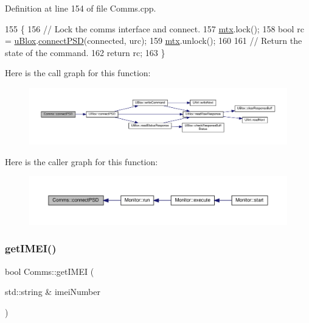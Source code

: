 Definition at line 154 of file Comms.\+cpp.


\begin{DoxyCode}
155 \{
156     \textcolor{comment}{// Lock the comms interface and connect.}
157     \hyperlink{class_comms_a21df861b1202573e4cd0cb5666d638fe}{mtx}.lock();
158     \textcolor{keywordtype}{bool} rc = \hyperlink{class_comms_ac64dea134b116147e5441172346dbd6c}{uBlox}.\hyperlink{class_u_blox_ac250bd4aea14e09b3a2595c2b8eda18a}{connectPSD}(connected, urc);
159     \hyperlink{class_comms_a21df861b1202573e4cd0cb5666d638fe}{mtx}.unlock();
160 
161     \textcolor{comment}{// Return the state of the command.}
162     \textcolor{keywordflow}{return} rc;
163 \}
\end{DoxyCode}
Here is the call graph for this function\+:\nopagebreak
\begin{figure}[H]
\begin{center}
\leavevmode
\includegraphics[width=350pt]{d8/dcc/class_comms_a6d720b51b543ec05b140efdde4cca824_cgraph}
\end{center}
\end{figure}
Here is the caller graph for this function\+:\nopagebreak
\begin{figure}[H]
\begin{center}
\leavevmode
\includegraphics[width=350pt]{d8/dcc/class_comms_a6d720b51b543ec05b140efdde4cca824_icgraph}
\end{center}
\end{figure}
\mbox{\label{class_comms_ab545396d2360e34fd94e7c3a996e967d}} 
\subsubsection{\texorpdfstring{get\+I\+M\+E\+I()}{getIMEI()}}
{\footnotesize\ttfamily bool Comms\+::get\+I\+M\+EI (\begin{DoxyParamCaption}\item[{std\+::string \&}]{imei\+Number }\end{DoxyParamCaption})}


